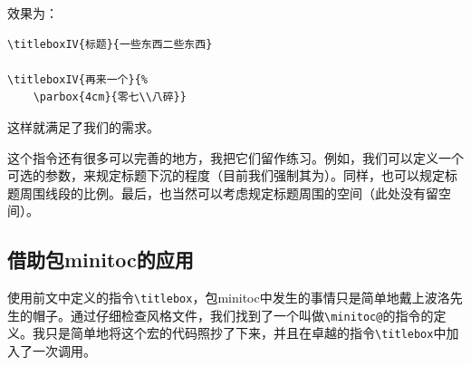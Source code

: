 效果为：

\begin{codelist}[10.22]{

}\begin{verbatim}
\titleboxIV{标题}{一些东西二些东西}

\titleboxIV{再来一个}{%
    \parbox{4cm}{零七\\八碎}}
\end{verbatim}
\end{codelist}

这样就满足了我们的需求。

\begin{ii}
这个指令还有很多可以完善的地方，我把它们留作练习。例如，我们可以定义一个可选的参数，来规定标题下沉的程度（目前我们强制其为\dm{-0.5ex}）。同样，也可以规定标题周围线段的比例。最后，也当然可以考虑规定标题周围的空间（此处没有留空间）。
\end{ii}

\subsection{借助包\textsf{minitoc}的应用}

使用前文中定义的指令\verb|\titlebox|，包\textsf{minitoc}中发生的事情只是简单地戴上波洛先生的帽子。通过仔细检查风格文件，我们找到了一个叫做\verb|\minitoc@|的指令的定义。我只是简单地将这个宏的代码照抄了下来，并且在卓越的指令\verb|\titlebox|中加入了一次调用。

